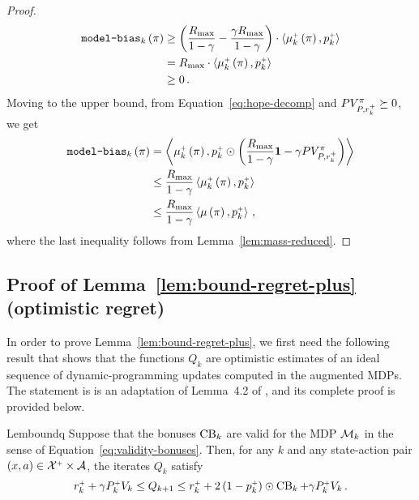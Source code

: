 \begin{proof}
    \begin{align*}
        \texttt{model-bias}_k \left( \pi \right) &\geq \left( \frac{R_{\max}}{1 - \gamma} - \frac{\gamma R_{\max}}{1 - \gamma} \right) \cdot \left\langle \mu_k^{\mathsf{\scriptscriptstyle +}} \left( \pi \right), p_k^{\mathsf{\scriptscriptstyle +}} \right\rangle \\
        &= R_{\max} \cdot \left\langle \mu_k^{\mathsf{\scriptscriptstyle +}} \left( \pi \right), p_k^{\mathsf{\scriptscriptstyle +}} \right\rangle \\
        &\geq 0\,.
    \end{align*}
    Moving to the upper bound, from Equation~\ref{eq:hope-decomp} and $P V_{P, r_k^{\mathsf{\scriptscriptstyle +}}}^\pi \succeq 0$, we get
    \begin{align*}
        \texttt{model-bias}_k \left( \pi \right) &= \left\langle \mu_k^{\mathsf{\scriptscriptstyle +}} \left( \pi \right), p_k^{\mathsf{\scriptscriptstyle +}} \odot \left( \frac{R_{\max}}{1 - \gamma} \mathbf{1} - \gamma P V_{P, r_k^{\mathsf{\scriptscriptstyle +}}}^\pi \right) \right\rangle \\
        &\leq \frac{R_{\max}}{1 - \gamma} \left\langle \mu_k^{\mathsf{\scriptscriptstyle +}} \left( \pi \right), p_k^{\mathsf{\scriptscriptstyle +}} \right\rangle \\
        &\leq \frac{R_{\max}}{1 - \gamma} \left\langle \mu \left( \pi \right), p_k^{\mathsf{\scriptscriptstyle +}} \right\rangle\,,
    \end{align*}
    where the last inequality follows from Lemma~\ref{lem:mass-reduced}.
\end{proof}


\subsection{Proof of Lemma~\ref{lem:bound-regret-plus} (optimistic regret)}
\label{app:bound-regret-plus}

In order to prove Lemma~\ref{lem:bound-regret-plus}, we first need the following result that shows that the functions $Q_k$ are optimistic estimates of an ideal sequence of dynamic-programming updates computed in the augmented MDPs. The statement is is an adaptation of Lemma~4.2 of \citet{MN23}, and its complete proof is provided below.
%
\begin{restatable}{Lem}{boundq} \label{lem:bound-q}
    Suppose that the bonuses $\operatorname{CB}_k$ are valid for the MDP $\mathcal{M}_k$ in the sense of Equation~\ref{eq:validity-bonuses}. Then, for any $k$ and any state-action pair $\left( x, a \right) \in \mathcal{X}^{\mathsf{\scriptscriptstyle +}} \times \mathcal{A}$, the iterates $Q_k$ satisfy
    \begin{equation*} \label{eq:bound-q}
        r_k^{\mathsf{\scriptscriptstyle +}} + \gamma P_k^\mathsf{\scriptscriptstyle +} V_k \leq Q_{k+1} \leq r_k^{\mathsf{\scriptscriptstyle +}} + 2 \left( 1 - p_k^{\mathsf{\scriptscriptstyle +}} \right) \odot \operatorname{CB}_k + \gamma P_k^\mathsf{\scriptscriptstyle +} V_k\,.
    \end{equation*}
\end{restatable}

